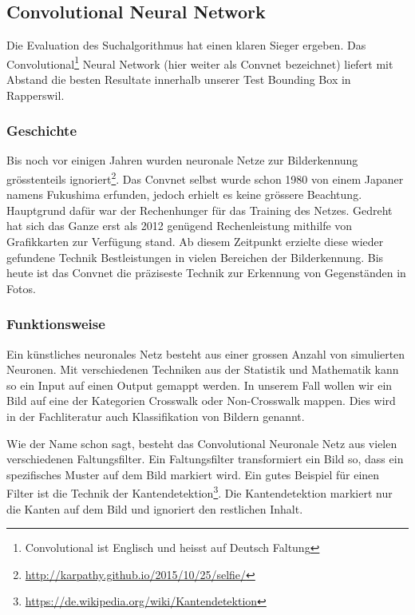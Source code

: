 \subsection{Convolutional Neural Network}
Die Evaluation des Suchalgorithmus hat einen klaren Sieger ergeben. Das Convolutional\footnote{Convolutional ist Englisch und heisst auf Deutsch Faltung} Neural Network (hier weiter als Convnet bezeichnet) liefert mit Abstand die besten Resultate innerhalb unserer Test \Gls{Bounding Box} in Rapperswil.

\subsubsection{Geschichte}
Bis noch vor einigen Jahren wurden neuronale Netze zur Bilderkennung grösstenteils ignoriert\footnote{\url{http://karpathy.github.io/2015/10/25/selfie/}}. Das Convnet selbst wurde schon 1980 von einem Japaner namens Fukushima erfunden, jedoch erhielt es keine grössere Beachtung. Hauptgrund dafür war der Rechenhunger für das Training des Netzes. Gedreht hat sich das Ganze erst als 2012 genügend Rechenleistung mithilfe von Grafikkarten zur Verfügung stand. Ab diesem Zeitpunkt erzielte diese wieder gefundene Technik Bestleistungen in vielen Bereichen der Bilderkennung. Bis heute ist das Convnet die präziseste Technik zur Erkennung von Gegenständen in Fotos.

\subsubsection{Funktionsweise}
Ein künstliches neuronales Netz besteht aus einer grossen Anzahl von simulierten Neuronen. Mit verschiedenen Techniken aus der Statistik und  Mathematik kann so ein Input auf einen Output gemappt werden. In unserem Fall wollen wir ein Bild auf eine der Kategorien Crosswalk oder Non-Crosswalk mappen. Dies wird in der Fachliteratur auch Klassifikation von Bildern genannt.

Wie der Name schon sagt, besteht das Convolutional Neuronale Netz aus vielen verschiedenen Faltungsfilter. Ein Faltungsfilter transformiert ein Bild so, dass ein spezifisches Muster auf dem Bild markiert wird. Ein gutes Beispiel für einen Filter ist die Technik der Kantendetektion\footnote{\url{https://de.wikipedia.org/wiki/Kantendetektion}}. Die Kantendetektion markiert nur die Kanten auf dem Bild und ignoriert den restlichen Inhalt.\\

